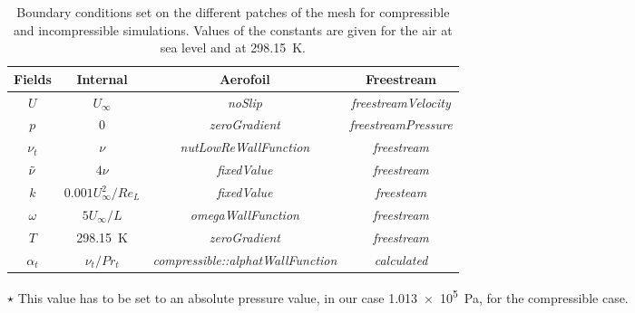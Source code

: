 \begin{subappendices}
	\begin{table}
		\centering
		\begin{threeparttable}
			\caption[Boundary conditions set on the different patches of the mesh.]{Boundary conditions set on the different patches of the mesh for compressible and incompressible simulations. Values of the constants are given for the air at sea level and at \SI{298.15}{\kelvin}.}
			\begin{tabular}{cccc}
				\toprule
				Fields & Internal & Aerofoil & Freestream \\
				\midrule
				$U$ & $U_\infty$ & \emph{noSlip} & \emph{freestreamVelocity} \\
				$p$ & 0\tnote{$\star$} & \emph{zeroGradient} & \emph{freestreamPressure} \\
				$\nu_t$ & $\nu$ & \emph{nutLowReWallFunction} & \emph{freestream} \\
				$\Tilde{\nu}$ & $4\nu$ & \emph{fixedValue} & \emph{freestream} \\
				$k$ & $0.001U_\infty^2/Re_L$ & \emph{fixedValue} & \emph{freesteam} \\
				$\omega$ & $5U_\infty/L$ & \emph{omegaWallFunction} & \emph{freestream} \\
				$T$ & \SI{298.15}{\kelvin} & \emph{zeroGradient} & \emph{freestream} \\
				$\alpha_t$ & $\nu_t/Pr_t$ & \emph{compressible::alphatWallFunction} & \emph{calculated} \\
				\bottomrule
			\end{tabular}
			\begin{tablenotes}
				\item [$\star$] This value has to be set to an absolute pressure value, in our case \SI{1.013e5}{\pascal}, for the compressible case.
			\end{tablenotes}
			\label{tab:boundaries}
		\end{threeparttable}
	\end{table}
	

\end{subappendices}
